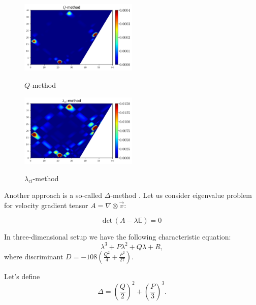 \documentclass[a4wide,fontsize=12pt]{article}
\begin{document}
\begin{figure}[H]
\begin{multicols}{2}
    \centering
    \includegraphics[width=0.5\textwidth]{Figs/VortexQ.png}
    \caption{$Q$-method}
    \label{fig:Q}
    \hfill
    \includegraphics[width=0.5\textwidth]{Figs/VortexLambdaCi.png}
    \caption{$\lambda_{ci}$-method}
    \label{fig:Lci}
    \end{multicols}
\end{figure}

Another approach is a so-called $\Delta$-method \cite{vortex}. Let us consider eigenvalue problem for velocity gradient tensor $A=\nabla\otimes  \vec v$:


\begin{equation}
  \text{det} \,( A -\lambda \mathbb E)=0
\end{equation}  

In three-dimensional setup we have the following characteristic equation: $$\lambda^3+P\lambda^2+Q\lambda+R,$$ 
\noindent where discriminant $D=-108\left( \frac{Q^2}{4} +\frac{P^3}{27}\right)$. 



Let's define $$\Delta=\left(\frac{Q}{2}\right)^2 +\left(\frac{P}{3}\right)^3.$$
\end{document}
